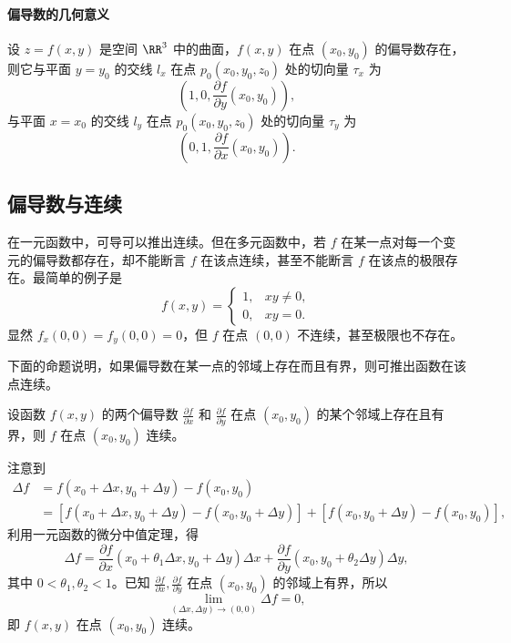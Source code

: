 \paragraph{偏导数的几何意义}
设 $z=f(x,y)$ 是空间 $\RR^3$ 中的曲面，$f(x,y)$ 在点 $(x_0,y_0)$ 的偏导数存在，则它与平面 $y=y_0$ 的交线 $l_x$ 在点 $p_0(x_0,y_0,z_0)$ 处的切向量 $\tau_x$ 为
\[
  \left(1,0,\frac{\partial f}{\partial y}(x_0,y_0)\right),
\]
与平面 $x=x_0$ 的交线 $l_y$ 在点 $p_0(x_0,y_0,z_0)$ 处的切向量 $\tau_y$ 为
\[
  \left(0,1,\frac{\partial f}{\partial x}(x_0,y_0)\right).
\]

\subsection{偏导数与连续}

在一元函数中，可导可以推出连续。但在多元函数中，若 $f$ 在某一点对每一个变元的偏导数都存在，却不能断言 $f$ 在该点连续，甚至不能断言 $f$ 在该点的极限存在。最简单的例子是
\[
  f(x,y)=
  \begin{cases}
    1, & xy\ne0,\\
    0, & xy=0.
  \end{cases}
\]
显然 $f_x(0,0)=f_y(0,0)=0$，但 $f$ 在点 $(0,0)$ 不连续，甚至极限也不存在。

下面的命题说明，如果偏导数在某一点的邻域上存在而且有界，则可推出函数在该点连续。

\begin{xproposition}[19.1.1]
设函数 $f(x,y)$ 的两个偏导数 $\frac{\partial f}{\partial x}$ 和 $\frac{\partial f}{\partial y}$ 在点 $(x_0,y_0)$ 的某个邻域上存在且有界，则 $f$ 在点 $(x_0,y_0)$ 连续。
\end{xproposition}
\begin{xproof}
注意到
\begin{align*}
  \Delta f
  &=f(x_0+\Delta x,y_0+\Delta y)-f(x_0,y_0)\\
  &=[f(x_0+\Delta x,y_0+\Delta y)-f(x_0,y_0+\Delta y)]
    +[f(x_0,y_0+\Delta y)-f(x_0,y_0)],
\end{align*}
利用一元函数的微分中值定理，得
\[
  \Delta f
  =\frac{\partial f}{\partial x}(x_0+\theta_1\Delta x,y_0+\Delta y)\Delta x
  +\frac{\partial f}{\partial y}(x_0,y_0+\theta_2\Delta y)\Delta y,
\]
其中 $0<\theta_1,\theta_2<1$。已知 $\frac{\partial f}{\partial x},\frac{\partial f}{\partial y}$ 在点 $(x_0,y_0)$ 的邻域上有界，所以
\[
  \lim_{(\Delta x,\Delta y)\to(0,0)}\Delta f=0,
\]
即 $f(x,y)$ 在点 $(x_0,y_0)$ 连续。
\end{xproof}

